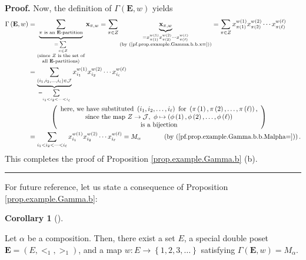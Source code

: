 \documentclass[numbers=enddot,12pt,final,onecolumn,notitlepage,abstracton]{scrartcl}
\theoremstyle{definition}
\newtheorem{coro}[theo]{Corollary}
\newenvironment{corollary}[1][]
{\begin{coro}[#1]\begin{leftbar}}
{\end{leftbar}\end{coro}}
\newenvironment{proof}[1][Proof]{\noindent\textbf{#1.} }{\ \rule{0.5em}{0.5em}}
\let\sumnonlimits\sum
\renewcommand{\sum}{\sumnonlimits\limits}
\newenvironment{verlong}{}{}
\begin{document}
\begin{verlong}
\begin{footnotesize}
\begin{proof}
Now, the definition of $\Gamma\left(  \mathbf{E},w\right)  $ yields%
\begin{align*}
\Gamma\left(  {\mathbf{E}},w\right)   &  =\underbrace{\sum_{\pi\text{ is an
}{\mathbf{E}}\text{-partition}}}_{\substack{=\sum_{\pi\in Z}\\\text{(since
}Z\text{ is the set of}\\\text{all }\mathbf{E}\text{-partitions)}}%
}{\mathbf{x}}_{\pi,w}=\sum_{\pi\in Z}\underbrace{{\mathbf{x}}_{\pi,w}%
}_{\substack{=x_{\pi\left(  1\right)  }^{w\left(  1\right)  }x_{\pi\left(
2\right)  }^{w\left(  2\right)  }\cdots x_{\pi\left(  \ell\right)  }^{w\left(
\ell\right)  }\\\text{(by (\ref{pf.prop.example.Gamma.b.b.x=}))}}}=\sum
_{\pi\in Z}x_{\pi\left(  1\right)  }^{w\left(  1\right)  }x_{\pi\left(
2\right)  }^{w\left(  2\right)  }\cdots x_{\pi\left(  \ell\right)  }^{w\left(
\ell\right)  }\\
&  =\underbrace{\sum_{\left(  i_{1},i_{2},\ldots,i_{\ell}\right)
\in\mathcal{J}}}_{=\sum_{i_{1}<i_{2}<\cdots<i_{\ell}}}x_{i_{1}}^{w\left(
1\right)  }x_{i_{2}}^{w\left(  2\right)  }\cdots x_{i_{\ell}}^{w\left(
\ell\right)  }\\
&  \ \ \ \ \ \ \ \ \ \ \left(
\begin{array}
[c]{c}%
\text{here, we have substituted }\left(  i_{1},i_{2},\ldots,i_{\ell}\right)
\text{ for }\left(  \pi\left(  1\right)  ,\pi\left(  2\right)  ,\ldots
,\pi\left(  \ell\right)  \right)  \text{,}\\
\text{since the map }Z\rightarrow\mathcal{J},\ \phi\mapsto\left(  \phi\left(
1\right)  ,\phi\left(  2\right)  ,\ldots,\phi\left(  \ell\right)  \right) \\
\text{is a bijection}%
\end{array}
\right) \\
&  =\sum_{i_{1}<i_{2}<\cdots<i_{\ell}}x_{i_{1}}^{w\left(  1\right)  }x_{i_{2}%
}^{w\left(  2\right)  }\cdots x_{i_{\ell}}^{w\left(  \ell\right)  }=M_{\alpha
}\ \ \ \ \ \ \ \ \ \ \left(  \text{by (\ref{pf.prop.example.Gamma.b.b.Malpha=}%
)}\right)  .
\end{align*}
This completes the proof of Proposition \ref{prop.example.Gamma.b} (b).
\end{proof}

For future reference, let us state a consequence of Proposition
\ref{prop.example.Gamma.b}:

\begin{corollary}
\label{cor.Malpha.Gamma}Let $\alpha$ be a composition. Then, there exist a set
$E$, a special double poset ${\mathbf{E}}=\left(  E,<_{1},>_{1}\right)  $, and
a map $w:E\rightarrow\left\{  1,2,3,\ldots\right\}  $ satisfying
$\Gamma\left(  {\mathbf{E}},w\right)  =M_{\alpha}$.
\end{corollary}


\end{footnotesize}
\end{verlong}
\end{document}
